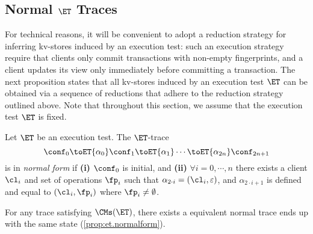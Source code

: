 \subsection{Normal \( \ET \) Traces}
\label{sec:normal-form-exist}
For technical reasons, it will be convenient to adopt a reduction strategy for inferring kv-stores induced by an 
execution test: such an execution strategy require that clients only commit transactions with non-empty fingerprints, 
and a client updates its view only immediately before committing a transaction. 
The next proposition states that all kv-stores induced by an execution test $\ET$ can be 
obtained via a sequence of reductions that adhere to the reduction strategy outlined above. 
Note that throughout this section, we assume that the execution test $\ET$ is fixed.

\begin{definition}
Let $\ET$ be an execution test. The $\ET$-trace
\[
\conf_0 \toET{\alpha_0} \conf_1 \toET{\alpha_1} \cdots \toET{\alpha_{2n}} \conf_{2n + 1}
\]
is in \emph{normal form} if \textbf{(i)} $\conf_0$ is initial, and 
\textbf{(ii)} $\forall i=0,\cdots, n$ there exists a client $\cl_i$ and set of operations $\fp_{i}$ such that 
$\alpha_{2 \cdot i} = (\cl_{i}, \varepsilon)$, and $\alpha_{2 \cdot i + 1}$ is defined and equal to $(\cl_{i}, \fp_{i})$ where \( \fp_i \neq \emptyset \).
\end{definition}

For any trace satisfying \( \CMs(\ET) \), 
there exists a equivalent normal trace ends up with the same state (\cref{prop:et.normalform}).

